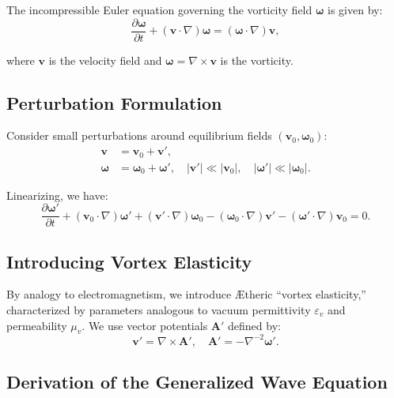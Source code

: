 \documentclass[a4paper,12pt]{article}
\begin{document}
The incompressible Euler equation governing the vorticity field $\boldsymbol{\omega}$ is given by:
\begin{equation}
    \frac{\partial \boldsymbol{\omega}}{\partial t} + (\mathbf{v}\cdot\nabla)\boldsymbol{\omega} = (\boldsymbol{\omega}\cdot\nabla)\mathbf{v},
\end{equation}


where $\mathbf{v}$ is the velocity field and $\boldsymbol{\omega} = \nabla \times \mathbf{v}$ is the vorticity.


\subsection{Perturbation Formulation}


Consider small perturbations around equilibrium fields $(\mathbf{v}_0, \boldsymbol{\omega}_0)$:
\begin{align}
    \mathbf{v} &= \mathbf{v}_0 + \mathbf{v}', \\
    \boldsymbol{\omega} &= \boldsymbol{\omega}_0 + \boldsymbol{\omega}', \quad |\mathbf{v}'| \ll |\mathbf{v}_0|, \quad |\boldsymbol{\omega}'| \ll |\boldsymbol{\omega}_0|.
\end{align}


Linearizing, we have:
\begin{equation}
    \frac{\partial \boldsymbol{\omega}'}{\partial t} + (\mathbf{v}_0 \cdot \nabla)\boldsymbol{\omega}' + (\mathbf{v}' \cdot \nabla)\boldsymbol{\omega}_0 - (\boldsymbol{\omega}_0\cdot\nabla)\mathbf{v}' - (\boldsymbol{\omega}'\cdot\nabla)\mathbf{v}_0 = 0.
\end{equation}


\subsection{Introducing Vortex Elasticity}


By analogy to electromagnetism, we introduce Ætheric ``vortex elasticity,'' characterized by parameters analogous to vacuum permittivity $\varepsilon_v$ and permeability $\mu_v$. We use vector potentials $\mathbf{A}'$ defined by:
\begin{equation}
    \mathbf{v}' = \nabla \times \mathbf{A}', \quad \mathbf{A}' = -\nabla^{-2}\boldsymbol{\omega}'.
\end{equation}


\subsection{Derivation of the Generalized Wave Equation}
\end{document}
